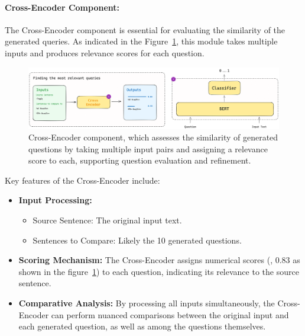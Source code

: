 \paragraph{Cross-Encoder Component:}\label{par:cross-encoder-component}
The Cross-Encoder component is essential for evaluating the similarity of the generated queries.
As indicated in the Figure~\ref{fig:cross-encoder-articture}, this module takes multiple inputs and produces relevance scores for each question.

\begin{figure}[ht!]
    \centering
    \begin{minipage}[b]{\textwidth}
        \centering
        \includegraphics[width=\textwidth]{res/Cross-Encoder}
    \end{minipage}
    \caption{Cross-Encoder component, which assesses the similarity of generated questions by taking multiple input pairs and assigning a relevance score to each, supporting question evaluation and refinement.}
    \label{fig:cross-encoder-articture}
\end{figure}

Key features of the Cross-Encoder include:

\begin{itemize}
    \item \textbf{Input Processing:}
    \begin{itemize}
        \item Source Sentence: The original input text.
        \item Sentences to Compare: Likely the 10 generated questions.
    \end{itemize}
    \item \textbf{Scoring Mechanism:} The Cross-Encoder assigns numerical scores (\eg, 0.83 as shown in the figure~\ref{fig:cross-encoder-articture}) to each question, indicating its relevance to the source sentence.
    \item \textbf{Comparative Analysis:} By processing all inputs simultaneously, the Cross-Encoder can perform nuanced comparisons between the original input and each generated question, as well as among the questions themselves.
\end{itemize}

